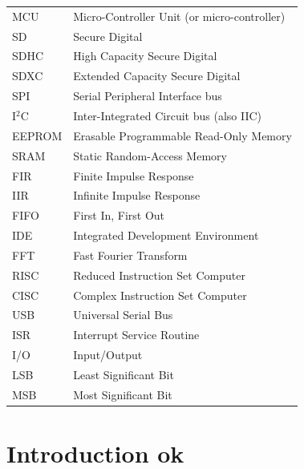 \documentclass[english,12pt,a4paper,pdftex,elec,utf8]{aaltothesis}
\begin{document}
\begin{tabular}{ll}
MCU & Micro-Controller Unit (or micro-controller) \\
SD & Secure Digital \\
SDHC & High Capacity Secure Digital \\
SDXC & Extended Capacity Secure Digital \\
SPI & Serial Peripheral Interface bus \\
I$^2$C & Inter-Integrated Circuit bus (also IIC) \\
EEPROM & Erasable Programmable Read-Only Memory \\
SRAM & Static Random-Access Memory \\
FIR & Finite Impulse Response \\
IIR & Infinite Impulse Response \\
FIFO & First In, First Out \\
IDE & Integrated Development Environment \\
FFT & Fast Fourier Transform \\
RISC & Reduced Instruction Set Computer \\
CISC & Complex Instruction Set Computer \\
USB & Universal Serial Bus \\
ISR & Interrupt Service Routine \\
I/O & Input/Output \\
LSB & Least Significant Bit \\
MSB & Most Significant Bit \\
\end{tabular}



\cleardoublepage
\storeinipagenumber
{}
\setcounter{page}{1}



\clearpage
\section{Introduction ok}
\thispagestyle{empty}
\end{document}

